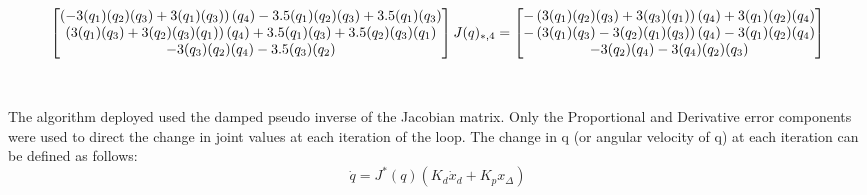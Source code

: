 \documentclass[11pt]{report}
\let\cos\relax
\let\sin\relax
\newcommand{\sin}[1]{\mathit{S}_{#1}}
\newcommand{\cos}[1]{\mathit{C}_{#1}}
\begin{document}
\begin{equation*}
\begin{bmatrix}
 \left(- 3 \sin{\left(q_{1} \right)} \sin{\left(q_{2} \right)} \sin{\left(q_{3} \right)} + 3 \cos{\left(q_{1} \right)} \cos{\left(q_{3} \right)}\right) \cos{\left(q_{4} \right)} - 3.5 \sin{\left(q_{1} \right)} \sin{\left(q_{2} \right)} \sin{\left(q_{3} \right)} + 3.5 \cos{\left(q_{1} \right)} \cos{\left(q_{3} \right)}
 \\
 \left(3 \sin{\left(q_{1} \right)} \cos{\left(q_{3} \right)} + 3 \sin{\left(q_{2} \right)} \sin{\left(q_{3} \right)} \cos{\left(q_{1} \right)}\right) \cos{\left(q_{4} \right)} + 3.5 \sin{\left(q_{1} \right)} \cos{\left(q_{3} \right)} + 3.5 \sin{\left(q_{2} \right)} \sin{\left(q_{3} \right)} \cos{\left(q_{1} \right)}
 \\
 - 3 \sin{\left(q_{3} \right)} \cos{\left(q_{2} \right)} \cos{\left(q_{4} \right)} - 3.5 \sin{\left(q_{3} \right)} \cos{\left(q_{2} \right)}
 
 
\end{bmatrix}\\ \\

J(q)_{*,4} = 
\begin{bmatrix}
- \left(3 \sin{\left(q_{1} \right)} \sin{\left(q_{2} \right)} \cos{\left(q_{3} \right)} + 3 \sin{\left(q_{3} \right)} \cos{\left(q_{1} \right)}\right) \sin{\left(q_{4} \right)} + 3 \sin{\left(q_{1} \right)} \cos{\left(q_{2} \right)} \cos{\left(q_{4} \right)}
\\
- \left(3 \sin{\left(q_{1} \right)} \sin{\left(q_{3} \right)} - 3 \sin{\left(q_{2} \right)} \cos{\left(q_{1} \right)} \cos{\left(q_{3} \right)}\right) \sin{\left(q_{4} \right)} - 3 \cos{\left(q_{1} \right)} \cos{\left(q_{2} \right)} \cos{\left(q_{4} \right)}
\\
- 3 \sin{\left(q_{2} \right)} \cos{\left(q_{4} \right)} - 3 \sin{\left(q_{4} \right)} \cos{\left(q_{2} \right)} \cos{\left(q_{3} \right)}
\end{bmatrix}
\end{equation*} \\ \\

\noindent The algorithm deployed used the damped pseudo inverse of the Jacobian matrix. Only the Proportional and Derivative error components were used to direct the change in joint values at each iteration of the loop. 
The change in q (or angular velocity of q) at each iteration can be defined as follows: \\


\begin{equation*}
    \dot{q} = J^{\text{*}}(q) (K_{d} \dot{x}_{d} + K_{p}x_{\Delta} )
\end{equation*}
\end{document}
